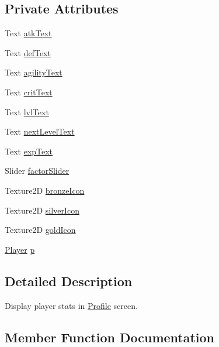 \subsection*{Private Attributes}
\begin{DoxyCompactItemize}
\item 
Text \mbox{\hyperlink{class_profile_ab602de9682b788a280b0a46c3b5f160a}{atk\+Text}}
\item 
Text \mbox{\hyperlink{class_profile_ae84926103e66a29a5efaa2006609d746}{def\+Text}}
\item 
Text \mbox{\hyperlink{class_profile_a26998b6035cb44a2fd1640899306fbd5}{agility\+Text}}
\item 
Text \mbox{\hyperlink{class_profile_a77a83d4e7a8954edc63e5f510591d3ce}{crit\+Text}}
\item 
Text \mbox{\hyperlink{class_profile_ad21775ca195e41c796f3c014d2bc1066}{lvl\+Text}}
\item 
Text \mbox{\hyperlink{class_profile_a603dea7538d222934d0be46c96b2dd79}{next\+Level\+Text}}
\item 
Text \mbox{\hyperlink{class_profile_afdf8e373da9625e574c6056eeaec4688}{exp\+Text}}
\item 
Slider \mbox{\hyperlink{class_profile_ad24ddb960c2358206baf0bf58306127f}{factor\+Slider}}
\item 
Texture2D \mbox{\hyperlink{class_profile_a517371f5911d980a904c0b01c8c0dd63}{bronze\+Icon}}
\item 
Texture2D \mbox{\hyperlink{class_profile_a78778870ae527b3457f77c117ace209e}{silver\+Icon}}
\item 
Texture2D \mbox{\hyperlink{class_profile_aedf7d88327e54a157f1d7b2cfcf4c0a2}{gold\+Icon}}
\item 
\mbox{\hyperlink{class_player}{Player}} \mbox{\hyperlink{class_profile_aaec42519f918113556cc3bc48d4c9680}{p}}
\end{DoxyCompactItemize}


\subsection{Detailed Description}
Display player stats in \mbox{\hyperlink{class_profile}{Profile}} screen. 

\subsection{Member Function Documentation}
\mbox{\label{class_profile_aa17a7ceae100a98b5962b238758a72b0}} 
